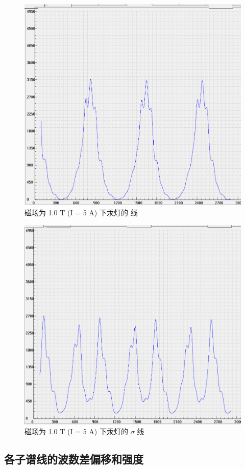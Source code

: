 \documentclass[font=default]{mpltx}
\begin{document}
\begin{figure}[htbp]
  \centering
  \includegraphics[width=0.85\linewidth]{fig/3.png}
  \caption{磁场为 1.0 T (I = 5 A) 下汞灯的 \pi 线}
  \label{fig:551}
\end{figure}
\begin{figure}[htbp]
  \centering
  \includegraphics[width=0.85\linewidth]{fig/4.png}
  \caption{磁场为 1.0 T (I = 5 A) 下汞灯的 $\sigma$ 线}
  \label{fig:552}
\end{figure}

\subsection{各子谱线的波数差偏移和强度}
\end{document}
